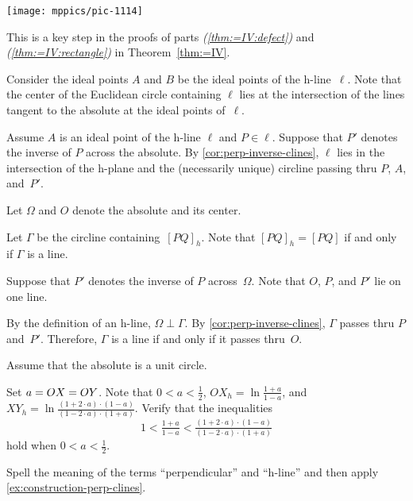 \begin{Figure}
\vskip-0mm
\centering
\texttt{[image: mppics/pic-1114]}
\end{Figure}

This is a key step in the proofs of parts \textit{(\ref{thm:=IV:defect})} and \textit{(\ref{thm:=IV:rectangle})} in Theorem~\ref{thm:=IV}.


\setcounter{eqtn}{0}

Consider the ideal points $A$ and $B$ be the ideal points of the h-line~$\ell$. 
Note that the center of the Euclidean circle containing $\ell$ lies 
at the intersection of the lines tangent to the absolute at the ideal points of~$\ell$.

Assume $A$ is an ideal point of the h-line $\ell$
and $P\in \ell$.
Suppose that $P'$ denotes the inverse of $P$ across the absolute.
By \ref{cor:perp-inverse-clines},
$\ell$ lies in the intersection of the h-plane and the (necessarily unique) circline 
passing thru $P$, $A$, and~$P'$.

Let $\Omega$ and $O$ denote the absolute and its center. 

Let $\Gamma$ be the circline containing~$[PQ]_h$.
Note that $[PQ]_h=[PQ]$ if and only if $\Gamma$ is a line.

Suppose that $P'$ denotes the inverse of $P$ across~$\Omega$.
Note that $O$, $P$, and $P'$ lie on one line.

By the definition of an h-line, $\Omega\perp \Gamma$.
By \ref{cor:perp-inverse-clines}, $\Gamma$ passes thru $P$ and~$P'$. 
Therefore, $\Gamma$
is a line if and only if it passes thru~$O$.

Assume that the absolute is a unit circle.

Set $a=OX=OY$.
Note that $0<a<\tfrac12$,
$
OX_h=\ln \tfrac{1+a}{1-a}$,
and
$XY_h=\ln \tfrac{(1+2\cdot a)\cdot(1-a)}{(1-2\cdot a)\cdot(1+a)}$.
Verify that the inequalities 
\[1<
\tfrac{1+a}{1-a}
<
\tfrac{(1+2\cdot a)\cdot(1-a)}{(1-2\cdot a)\cdot(1+a)}\]
hold when $0<a<\tfrac12$.

Spell the meaning of the terms ``perpendicular'' and ``h-line'' and then apply \ref{ex:construction-perp-clines}.

